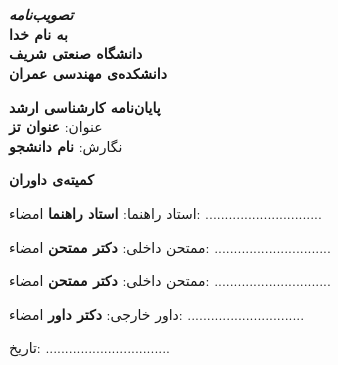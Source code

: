 \chapter*{}
\begin{center}
\large
\textbf{\textit{تصویب‌نامه}}\\
\vspace{0.9cm}
\textbf{به نام خدا}\\
\textbf{دانشگاه صنعتی شریف}\\
\textbf{دانشکده‌ی مهندسی عمران}\\
\end{center}
\vspace{0.9cm}

\textbf{پایان‌نامه کارشناسی ارشد}\\

عنوان:
\textbf{عنوان تز}\\

نگارش:
\textbf{نام دانشجو}\\

\vspace{0.9cm}

\textbf{کمیته‌ی داوران}
\vspace{0.9cm}

استاد راهنما:
\textbf{استاد راهنما} \hfill امضاء: ..............................
\vspace{0.9cm}

ممتحن داخلی:
\textbf{دکتر ممتحن} \hfill امضاء: ..............................
\vspace{0.9cm}

ممتحن داخلی:
\textbf{دکتر ممتحن} \hfill امضاء: ..............................
\vspace{0.9cm}

داور خارجی:
\textbf{دکتر داور} \hfill امضاء: ..............................
\vspace{0.9cm}


\hfill تاریخ: ................................

